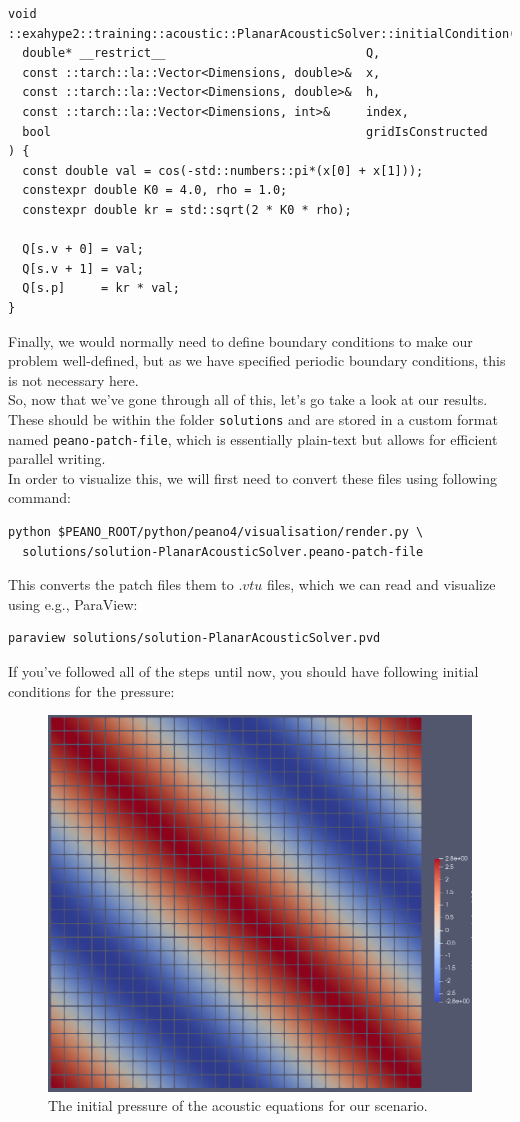 \documentclass[12pt,letterpaper]{article}
\begin{document}
\begin{lstlisting}[style = C++]
void ::exahype2::training::acoustic::PlanarAcousticSolver::initialCondition(
  double* __restrict__                            Q,
  const ::tarch::la::Vector<Dimensions, double>&  x,
  const ::tarch::la::Vector<Dimensions, double>&  h,
  const ::tarch::la::Vector<Dimensions, int>&     index,
  bool                                            gridIsConstructed
) {
  const double val = cos(-std::numbers::pi*(x[0] + x[1]));
  constexpr double K0 = 4.0, rho = 1.0;
  constexpr double kr = std::sqrt(2 * K0 * rho);

  Q[s.v + 0] = val;
  Q[s.v + 1] = val;
  Q[s.p]     = kr * val;
}
\end{lstlisting}

Finally, we would normally need to define boundary conditions to make our problem well-defined,
but as we have specified periodic boundary conditions, this is not necessary here.\\

So, now that we've gone through all of this, let's go take a look at our results.
These should be within the folder \texttt{solutions} and are stored in a custom format named \texttt{peano-patch-file},
which is essentially plain-text but allows for efficient parallel writing.\\
In order to visualize this, we will first need to convert these files using following command:\\

\begin{lstlisting}[style = Bash]
python $PEANO_ROOT/python/peano4/visualisation/render.py \
  solutions/solution-PlanarAcousticSolver.peano-patch-file
\end{lstlisting}

This converts the patch files them to $.vtu$ files, which we can read and visualize using e.g., ParaView:

\begin{lstlisting}[style = Bash]
paraview solutions/solution-PlanarAcousticSolver.pvd
\end{lstlisting}

If you've followed all of the steps until now, you should have following initial conditions for the pressure:

\begin{figure}[!h]
\centering
\includegraphics[width=0.60\linewidth]{PlanarAcoustic_initial.png}
\caption{The initial pressure of the acoustic equations for our scenario.}
\end{figure}
\end{document}
